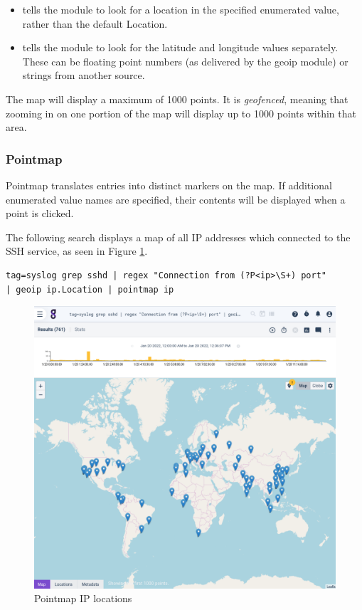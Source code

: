 \begin{itemize}
\item
   tells the module to
  look for a location in the specified enumerated value, rather than the
  default Location.
\item
   tells the module to look
  for the latitude and longitude values separately. These can be
  floating point numbers (as delivered by the geoip module) or strings
  from another source.
\end{itemize}

The map will display a maximum of 1000 points. It is \emph{geofenced}, meaning
that zooming in on one portion of the map will display up to 1000 points
within that area.

\subsubsection{Pointmap}

Pointmap translates entries into distinct markers on the map. If
additional enumerated value names are specified, their contents will be
displayed when a point is clicked.

The following search displays a map of all IP addresses which connected to the SSH service, as seen in Figure \ref{fig:pointmap-ip}.

\begin{Verbatim}[breaklines=true]
tag=syslog grep sshd | regex "Connection from (?P<ip>\S+) port"
| geoip ip.Location | pointmap ip
\end{Verbatim}

\begin{figure}
	\includegraphics[width=0.6\linewidth]{images/pointmap-ip.png}
	\caption{Pointmap IP locations}
	\label{fig:pointmap-ip}
\end{figure}

